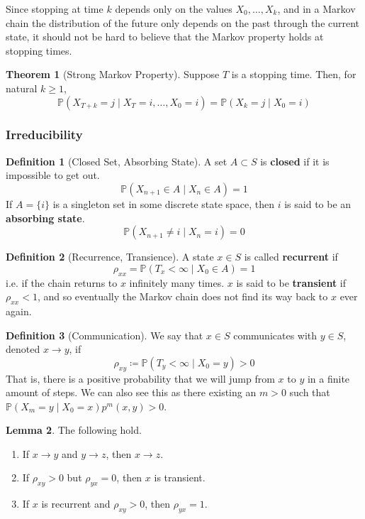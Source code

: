 \documentclass{article}
\theoremstyle{definition}
\newtheorem{theorem}{Theorem}[section]
\newtheorem{lemma}[theorem]{Lemma}
\theoremstyle{remark}
\theoremstyle{definition}
\newtheorem{definition}{Definition}[section]
\begin{document}
Since stopping at time $k$ depends only on the values $X_0, \ldots, X_k$, and in a Markov chain the distribution of the future only depends on the past through the current state, it should not be hard to believe that the Markov property holds at stopping times. 

\begin{theorem}[Strong Markov Property]
Suppose $T$ is a stopping time. Then, for natural $k \geq 1$, 
\[\mathbb{P}(X_{T + k} = j \mid X_T = i, \ldots, X_0 = i) = \mathbb{P}(X_k = j \mid X_0 = i) \]
\end{theorem}

\subsubsection{Irreducibility}

\begin{definition}[Closed Set, Absorbing State]
A set $A \subset S$ is \textbf{closed} if it is impossible to get out. 
\[\mathbb{P}(X_{n + 1} \in A \mid X_n \in A) = 1\]
If $A = \{i\}$ is a singleton set in some discrete state space, then $i$ is said to be an \textbf{absorbing state}. 
\[\mathbb{P}(X_{n+1} \neq i \; | \; X_n = i) = 0\]
\end{definition}

\begin{definition}[Recurrence, Transience]
A state $x \in S$ is called \textbf{recurrent} if 
\[\rho_{xx} = \mathbb{P}(T_x < \infty \mid X_0 \in A) = 1\]
i.e. if the chain returns to $x$ infinitely many times. $x$ is said to be \textbf{transient} if $\rho_{xx} < 1$, and so eventually the Markov chain does not find its way back to $x$ ever again. 
\end{definition}

\begin{definition}[Communication]
We say that $x \in S$ communicates with $y \in S$, denoted $x \rightarrow y$, if 
\[\rho_{xy} \coloneqq \mathbb{P}(T_y < \infty \mid X_0 = y) > 0\]
That is, there is a positive probability that we will jump from $x$ to $y$ in a finite amount of steps. We can also see this as there existing an $m > 0$ such that $\mathbb{P}(X_m = y \mid X_0 = x) p^m (x, y) > 0$. 
\end{definition}

\begin{lemma}
The following hold. 
\begin{enumerate}
    \item If $x \rightarrow y$ and $y \rightarrow z$, then $x \rightarrow z$. 
    \item If $\rho_{xy} > 0$ but $\rho_{yx} = 0$, then $x$ is transient.  
    \item If $x$ is recurrent and $\rho_{xy} > 0$, then $\rho_{yx} = 1$. 
\end{enumerate}
\end{lemma}
\end{document}
